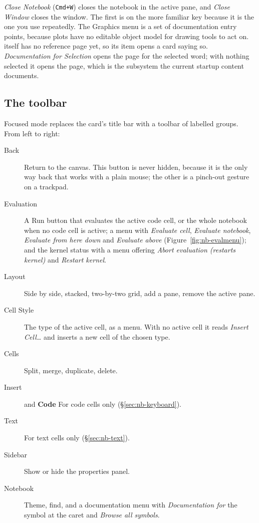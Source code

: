 \emph{Close Notebook} (\texttt{Cmd+W}) closes the notebook in the active
pane, and \emph{Close Window} closes the window. The first is on the more
familiar key because it is the one you use repeatedly. The Graphics menu is a
set of documentation entry points, because plots have no editable object
model for drawing tools to act on.  itself has no reference
page yet, so its item opens a card saying so. \emph{Documentation for Selection} opens
the page for the selected word; with nothing selected it opens the 
page, which is the subsystem the current startup content documents.%

\subsection{The toolbar}

Focused mode replaces the card's title bar with a toolbar of labelled
groups. From left to right:

\begin{description}
\item[Back] Return to the canvas. This button is never hidden, because it is
  the only way back that works with a plain mouse; the other is a pinch-out
  gesture on a trackpad.
\item[Evaluation] A Run button that evaluates the active code cell, or the
  whole notebook when no code cell is active; a menu with \emph{Evaluate
  cell}, \emph{Evaluate notebook}, \emph{Evaluate from here down} and
  \emph{Evaluate above} (Figure~\ref{fig:nb-evalmenu}); and the kernel status
  with a menu offering \emph{Abort evaluation (restarts kernel)} and
  \emph{Restart kernel}.
\item[Layout] Side by side, stacked, two-by-two grid, add a pane, remove the
  active pane.
\item[Cell Style] The type of the active cell, as a menu. With no active cell
  it reads \emph{Insert Cell\ldots} and inserts a new cell of the chosen type.
\item[Cells] Split, merge, duplicate, delete.
\item[Insert] and \textbf{Code} For code cells only (\S\ref{sec:nb-keyboard}).
\item[Text] For text cells only (\S\ref{sec:nb-text}).
\item[Sidebar] Show or hide the properties panel.
\item[Notebook] Theme, find, and a documentation menu with \emph{Documentation
  for} the symbol at the caret and \emph{Browse all symbols}.
\end{description}

